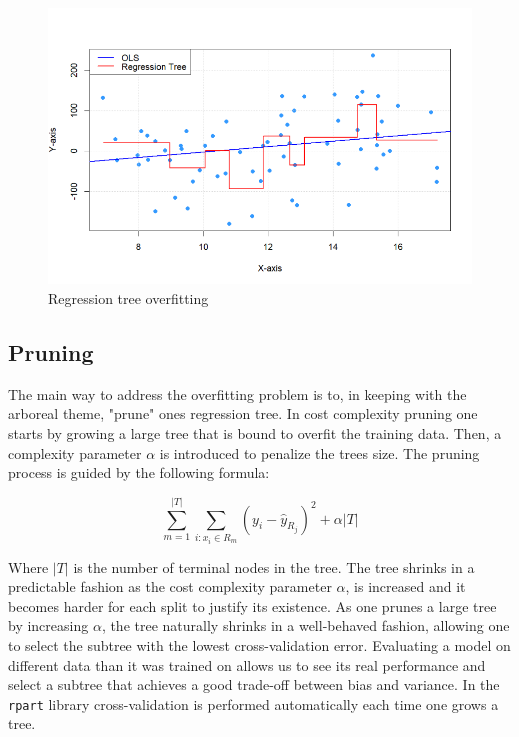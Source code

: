 \documentclass[12pt]{article}
\begin{document}
\begin{figure}
    \centering
    \includegraphics[scale=0.50]{image.png}
    \caption{Regression tree overfitting}
    \label{overfitting_tree}
\end{figure}


\subsection{Pruning}

The main way to address the overfitting problem is to, in keeping with the arboreal theme, "prune" ones regression tree. In cost complexity pruning one starts by growing a large tree that is bound to overfit the training data. Then, a complexity parameter $\alpha$ is introduced to penalize the trees size. The pruning process is guided by the following formula:

\begin{equation}
    \sum_{m=1}^{|T|} \sum_{i: x_i \in R_m} (y_i - \hat{y}_{R_j})^2 + \alpha|T|
\end{equation}

Where $|T|$ is the number of terminal nodes in the tree. The tree shrinks in a predictable fashion as the cost complexity parameter $\alpha$, is increased and it becomes harder for each split to justify its existence. As one prunes a large tree by increasing $\alpha$, the tree naturally shrinks in a well-behaved fashion, allowing one to select the subtree with the lowest cross-validation error. Evaluating a model on different data than it was trained on allows us to see its real performance and select a subtree that achieves a good trade-off between bias and variance. In the \texttt{rpart} library cross-validation is performed automatically each time one grows a tree.
\end{document}

